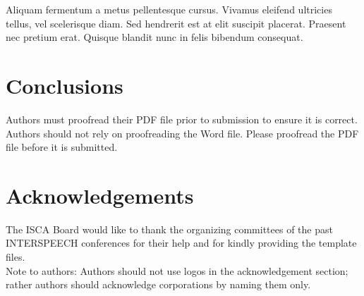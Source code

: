 \documentclass[a4paper]{article}
\begin{document}
Aliquam fermentum a metus pellentesque cursus. Vivamus eleifend ultricies tellus, vel scelerisque diam. Sed hendrerit est at elit suscipit placerat. Praesent nec pretium erat. Quisque blandit nunc in felis bibendum consequat. 

\section{Conclusions}

Authors must proofread their PDF file prior to submission to ensure it is correct. Authors should not rely on proofreading the Word file. Please proofread the PDF file before it is submitted.

\section{Acknowledgements}

The ISCA Board would like to thank the organizing committees of the past INTERSPEECH conferences for their help and for kindly providing the template files. \\
Note to authors: Authors should not use logos in the acknowledgement section; rather authors should acknowledge corporations by naming them only.






\end{document}

